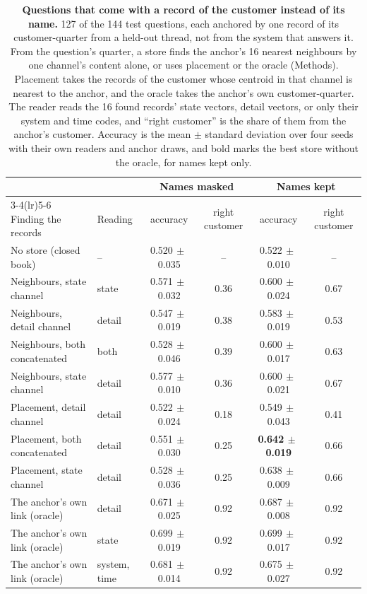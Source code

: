 \documentclass[11pt]{article}
\begin{document}
\begin{table}[h]
\centering
\small
\caption{\textbf{Questions that come with a record of the customer instead of its name.} 127 of the 144 test questions, each anchored by one record of its customer-quarter from a held-out thread, not from the system that answers it. From the question's quarter, a store finds the anchor's 16 nearest neighbours by one channel's content alone, or uses placement or the oracle (Methods). Placement takes the records of the customer whose centroid in that channel is nearest to the anchor, and the oracle takes the anchor's own customer-quarter. The reader reads the 16 found records' state vectors, detail vectors, or only their system and time codes, and ``right customer'' is the share of them from the anchor's customer. Accuracy is the mean $\pm$ standard deviation over four seeds with their own readers and anchor draws, and bold marks the best store without the oracle, for names kept only.}
\label{tab:anchor}
\setlength{\tabcolsep}{3.5pt}\begin{tabular}{llcccc}
\toprule
& & \multicolumn{2}{c}{Names masked} & \multicolumn{2}{c}{Names kept} \\
\cmidrule(lr){3-4}\cmidrule(lr){5-6}
Finding the records & Reading & accuracy & right customer & accuracy & right customer \\
\midrule
No store (closed book) & -- & 0.520{\scriptsize$\,\pm\,$0.035} & -- & 0.522{\scriptsize$\,\pm\,$0.010} & -- \\
\addlinespace[3pt]
Neighbours, state channel & state & 0.571{\scriptsize$\,\pm\,$0.032} & 0.36 & 0.600{\scriptsize$\,\pm\,$0.024} & 0.67 \\
Neighbours, detail channel & detail & 0.547{\scriptsize$\,\pm\,$0.019} & 0.38 & 0.583{\scriptsize$\,\pm\,$0.019} & 0.53 \\
Neighbours, both concatenated & both & 0.528{\scriptsize$\,\pm\,$0.046} & 0.39 & 0.600{\scriptsize$\,\pm\,$0.017} & 0.63 \\
Neighbours, state channel & detail & 0.577{\scriptsize$\,\pm\,$0.010} & 0.36 & 0.600{\scriptsize$\,\pm\,$0.021} & 0.67 \\
\addlinespace[3pt]
Placement, detail channel & detail & 0.522{\scriptsize$\,\pm\,$0.024} & 0.18 & 0.549{\scriptsize$\,\pm\,$0.043} & 0.41 \\
Placement, both concatenated & detail & 0.551{\scriptsize$\,\pm\,$0.030} & 0.25 & \textbf{0.642{\scriptsize$\,\pm\,$0.019}} & 0.66 \\
Placement, state channel & detail & 0.528{\scriptsize$\,\pm\,$0.036} & 0.25 & 0.638{\scriptsize$\,\pm\,$0.009} & 0.66 \\
\addlinespace[3pt]
The anchor's own link (oracle) & detail & 0.671{\scriptsize$\,\pm\,$0.025} & 0.92 & 0.687{\scriptsize$\,\pm\,$0.008} & 0.92 \\
The anchor's own link (oracle) & state & 0.699{\scriptsize$\,\pm\,$0.019} & 0.92 & 0.699{\scriptsize$\,\pm\,$0.017} & 0.92 \\
The anchor's own link (oracle) & system, time & 0.681{\scriptsize$\,\pm\,$0.014} & 0.92 & 0.675{\scriptsize$\,\pm\,$0.027} & 0.92 \\
\bottomrule
\end{tabular}
\end{table}
\end{document}
